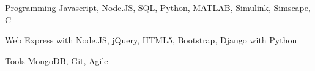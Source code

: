 


\begin{cvskills}


\cvskill
{Programming} %
{Javascript, Node.JS, SQL, Python, MATLAB, Simulink, Simscape, C} %


\cvskill
{Web} %
{Express with Node.JS, jQuery, HTML5, Bootstrap, Django with Python} %


\cvskill
{Tools}
{MongoDB, Git, Agile}



\end{cvskills}